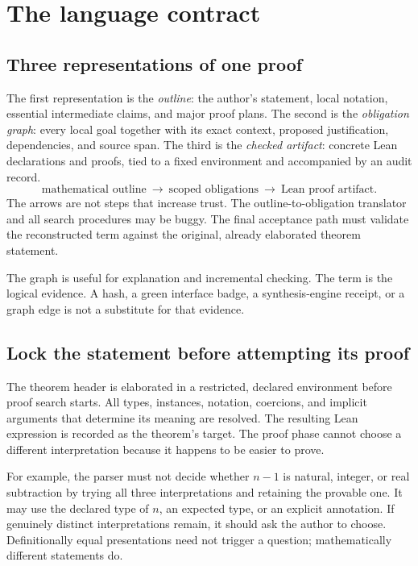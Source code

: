 \documentclass[11pt,a4paper]{article}
\theoremstyle{definition}
\theoremstyle{remark}
\numberwithin{equation}{section}
\begin{document}
\section{The language contract}
\label{sec:contract}
\subsection{Three representations of one proof}
The first representation is the \emph{outline}: the author's statement, local notation, essential intermediate claims, and major proof plans. The second is the \emph{obligation graph}: every local goal together with its exact context, proposed justification, dependencies, and source span. The third is the \emph{checked artifact}: concrete Lean declarations and proofs, tied to a fixed environment and accompanied by an audit record.
\[
\boxed{\text{mathematical outline}}
\ \longrightarrow\
\boxed{\text{scoped obligations}}
\ \longrightarrow\
\boxed{\text{Lean proof artifact}}.
\]
The arrows are not steps that increase trust. The outline-to-obligation translator and all search procedures may be buggy. The final acceptance path must validate the reconstructed term against the original, already elaborated theorem statement.

The graph is useful for explanation and incremental checking. The term is the logical evidence. A hash, a green interface badge, a synthesis-engine receipt, or a graph edge is not a substitute for that evidence.

\subsection{Lock the statement before attempting its proof}
The theorem header is elaborated in a restricted, declared environment before proof search starts. All types, instances, notation, coercions, and implicit arguments that determine its meaning are resolved. The resulting Lean expression is recorded as the theorem's target. The proof phase cannot choose a different interpretation because it happens to be easier to prove.

For example, the parser must not decide whether $n-1$ is natural, integer, or real subtraction by trying all three interpretations and retaining the provable one. It may use the declared type of $n$, an expected type, or an explicit annotation. If genuinely distinct interpretations remain, it should ask the author to choose. Definitionally equal presentations need not trigger a question; mathematically different statements do.
\end{document}
